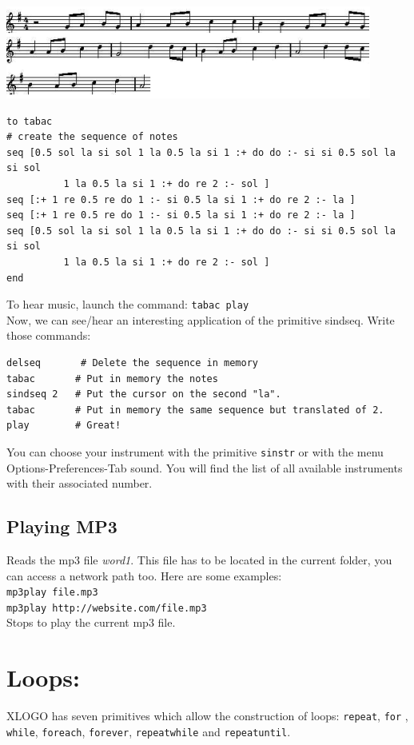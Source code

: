 \includegraphics{pics/partition.png}
\begin{verbatim}
to tabac
# create the sequence of notes
seq [0.5 sol la si sol 1 la 0.5 la si 1 :+ do do :- si si 0.5 sol la si sol
          1 la 0.5 la si 1 :+ do re 2 :- sol ]
seq [:+ 1 re 0.5 re do 1 :- si 0.5 la si 1 :+ do re 2 :- la ]
seq [:+ 1 re 0.5 re do 1 :- si 0.5 la si 1 :+ do re 2 :- la ]
seq [0.5 sol la si sol 1 la 0.5 la si 1 :+ do do :- si si 0.5 sol la si sol
          1 la 0.5 la si 1 :+ do re 2 :- sol ]
end
\end{verbatim}

To hear music, launch the command: \texttt{tabac play}\\
Now, we can see/hear an interesting application of the primitive {sindseq}. Write those commands:\\

\begin{verbatim}
delseq       # Delete the sequence in memory
tabac       # Put in memory the notes
sindseq 2   # Put the cursor on the second "la".
tabac       # Put in memory the same sequence but translated of 2.
play        # Great!
\end{verbatim}

You can choose your instrument with the primitive \texttt{sinstr} or with the menu Options-Preferences-Tab sound. You will find the list of all available instruments with their associated number.
\subsection{Playing MP3}
\noindent{}
Reads the mp3 file \textit{word1}. This file has to be located in the current folder, you can access a network path too. Here are some examples:\\
\texttt{mp3play file.mp3}\\
\texttt{mp3play http://website.com/file.mp3}\\
Stops to play the current mp3 file.
\section{Loops:}
XLOGO has seven primitives which allow the construction of loops: \texttt{repeat}, \texttt{for} , \texttt{while}, \texttt{foreach}, \texttt{forever}, \texttt{repeatwhile} and \texttt{repeatuntil}.

